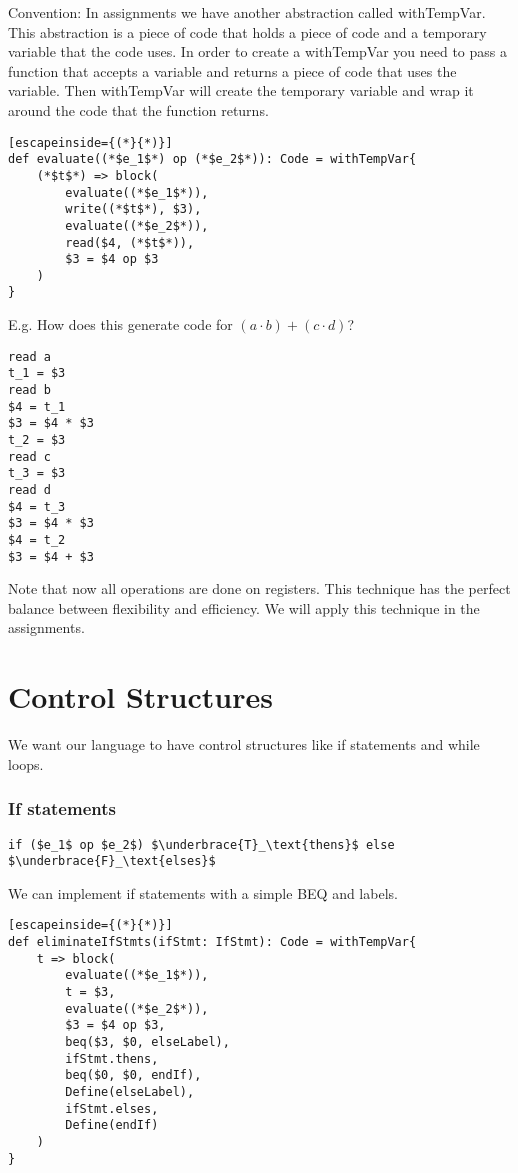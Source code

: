\documentclass[12pt, letterpaper]{article}
\begin{document}
Convention: In assignments we have another abstraction called withTempVar. This abstraction is a piece of code that holds a piece of code and a temporary variable that the code uses. In order to create a withTempVar you need to pass a function that accepts a variable and returns a piece of code that uses the variable. Then withTempVar will create the temporary variable and wrap it around the code that the function returns.\\

\begin{lstlisting}[escapeinside={(*}{*)}]
def evaluate((*$e_1$*) op (*$e_2$*)): Code = withTempVar{
	(*$t$*) => block(
		evaluate((*$e_1$*)),
		write((*$t$*), $3),
		evaluate((*$e_2$*)),
		read($4, (*$t$*)),
		$3 = $4 op $3
	)
}
\end{lstlisting}

E.g. How does this generate code for \((a \cdot b) + (c \cdot d)\)?

\begin{verbatim}
read a
t_1 = $3
read b
$4 = t_1
$3 = $4 * $3
t_2 = $3
read c
t_3 = $3
read d
$4 = t_3
$3 = $4 * $3
$4 = t_2
$3 = $4 + $3
\end{verbatim}

Note that now all operations are done on registers. This technique has the perfect balance between flexibility and efficiency. We will apply this technique in the assignments.

\section{Control Structures}
We want our language to have control structures like if statements and while loops.

\subsubsection{If statements}
\begin{lstlisting}[mathescape]
if ($e_1$ op $e_2$) $\underbrace{T}_\text{thens}$ else $\underbrace{F}_\text{elses}$
\end{lstlisting}

We can implement if statements with a simple BEQ and labels.\\

\begin{lstlisting}[escapeinside={(*}{*)}]
def eliminateIfStmts(ifStmt: IfStmt): Code = withTempVar{
	t => block(
		evaluate((*$e_1$*)),
		t = $3,
		evaluate((*$e_2$*)),
		$3 = $4 op $3,
		beq($3, $0, elseLabel),
		ifStmt.thens,
		beq($0, $0, endIf),
		Define(elseLabel),
		ifStmt.elses,
		Define(endIf)
	)
}
\end{lstlisting}
\end{document}
